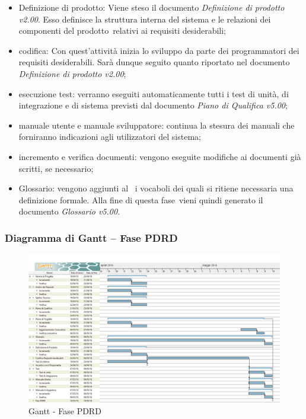 \documentclass[../PianoProgetto.tex]{subfiles}
\begin{document}
		\begin{itemize}
			\item Definizione di prodotto: Viene steso il documento \textit{Definizione di prodotto v2.00}. Esso definisce la struttura interna del sistema e le relazioni dei componenti del prodotto\g\ relativi ai requisiti desiderabili;

			\item codifica: Con quest'attività inizia lo sviluppo da parte dei programmatori dei requisiti desiderabili. Sarà dunque seguito quanto riportato nel documento \textit{Definizione di prodotto v2.00};

	 		\item esecuzione test: verranno eseguiti automaticamente tutti i test di unità, di integrazione e di sistema previsti dal documento \textit{Piano di Qualifica v5.00};

			\item manuale utente e manuale sviluppatore: continua la stesura dei manuali che forniranno indicazioni agli utilizzatori del sistema;

			\item incremento e verifica documenti: vengono eseguite modifiche ai documenti già scritti, se necessario;

			\item Glossario: vengono aggiunti al \glossario\ i vocaboli dei quali si ritiene necessaria una definizione formale. Alla fine di questa fase\g\ vieni quindi generato il documento \textit{Glossario v5.00}.
		\end{itemize}
		\newpage
		\subsubsection{Diagramma di Gantt – Fase PDRD}
			\begin{figure}[!h]
				\centering
				\includegraphics[width=\textwidth]{gantt_png/5-requisiti_desiderabili}
				\caption{Gantt - Fase PDRD}
				\label{fig:Gantt - Fase PDRD}
			\end{figure}
			
\end{document}
